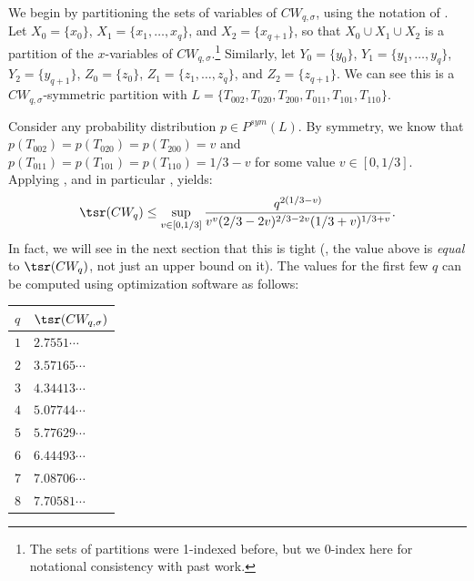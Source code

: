 \documentclass{toc}
\begin{document}
We begin by partitioning the  
%
sets of variables
of $CW_{q,\sigma}$, using the notation of . Let $X_0 = \{ x_0 \}$, $X_1 = \{ x_1, \ldots, x_q \}$, and $X_2 = \{ x_{q+1} \}$, so that $X_0 \cup X_1 \cup X_2$ is a partition of the $x$-variables of $CW_{q,\sigma}$.\footnote{The sets of partitions were 1-indexed before, but we 0-index here for notational consistency with past work.} Similarly, let $Y_0 = \{ y_0 \}$, $Y_1 = \{ y_1, \ldots, y_q \}$, $Y_2 = \{ y_{q+1} \}$, $Z_0 = \{ z_0 \}$, $Z_1 = \{ z_1, \ldots, z_q \}$, and $Z_2 = \{ z_{q+1} \}$. We can see this is a $CW_{q,\sigma}$-symmetric partition with $L = \{ T_{002}, T_{020}, T_{200}, T_{011}, T_{101}, T_{110} \}$. 

Consider any probability distribution $p \in P^{sym}(L)$. By symmetry, we know that $p(T_{002}) = p(T_{020}) = p(T_{200}) = v$ and $p(T_{011}) = p(T_{101}) = p(T_{110}) = 1/3 - v$ for some value $v \in [0,1/3]$. Applying , and in particular , yields:
$$\tsr(CW_q) \leq \sup_{v \in [0,1/3]} \frac{q^{2(1/3 - v)}}{v^v (2/3 - 2v)^{2/3 - 2v} (1/3 + v)^{1/3+v}}.$$
In fact, we will see in the next section that this is tight (\ie, the value above is \emph{equal} to $\tsr(CW_q)$, not just an upper bound on it). The values for the first few $q$ can be computed using optimization software as follows:

\begin{center}
\begin{tabular}{l|l}
$q$ & $\tsr(CW_{q,\sigma})$ \\ \hline
$1$                                & $2.7551\cdots$                                                        \\
$2$                                & $3.57165\cdots$                                                        \\
$3$                                & $4.34413\cdots$                                                        \\
$4$                                & $5.07744\cdots$                                                        \\
$5$                                & $5.77629\cdots$                                                           \\
$6$                                & $6.44493\cdots$                                                       \\
$7$                                & $7.08706\cdots$                                                       \\
$8$                                & $7.70581\cdots$                                                   
\end{tabular}
\end{center}
\end{document}

